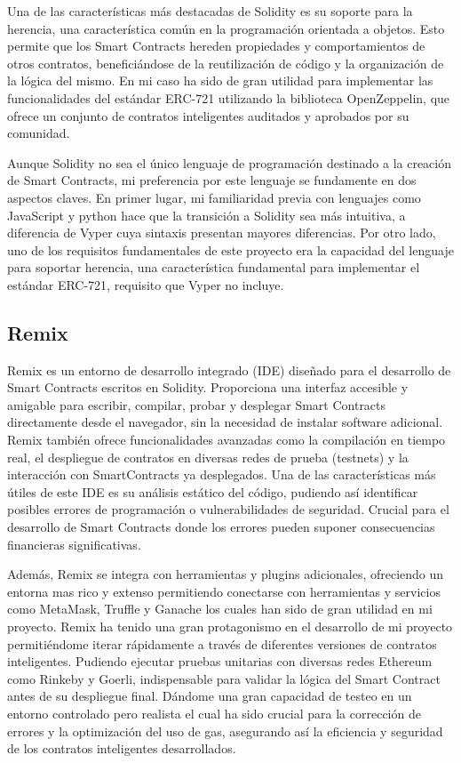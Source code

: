 Una de las características más destacadas de Solidity es su soporte para la herencia, una característica común en la programación orientada a objetos. Esto permite que los Smart Contracts hereden propiedades y comportamientos de otros contratos, beneficiándose de la reutilización de código y la organización de la lógica del mismo. En mi caso ha sido de gran utilidad para implementar las funcionalidades del estándar ERC-721 utilizando la biblioteca OpenZeppelin, que ofrece un conjunto de contratos inteligentes auditados y aprobados por su comunidad.

Aunque Solidity no sea el único lenguaje de programación destinado a la creación de Smart Contracts, mi preferencia por este lenguaje se fundamente en dos aspectos claves.
En primer lugar, mi familiaridad previa con lenguajes como JavaScript y python hace que la transición a Solidity sea más intuitiva, a diferencia de Vyper cuya sintaxis presentan mayores diferencias.
Por otro lado, uno de los requisitos fundamentales de este proyecto era la capacidad del lenguaje para soportar herencia, una característica fundamental para implementar el estándar ERC-721, requisito que Vyper no incluye.


\subsection{Remix}

Remix es un entorno de desarrollo integrado (IDE) diseñado para el desarrollo de Smart Contracts escritos en Solidity. Proporciona una interfaz accesible y amigable para escribir, compilar, probar y desplegar Smart Contracts directamente desde el navegador, sin la necesidad de instalar software adicional.
Remix también ofrece funcionalidades avanzadas como la compilación en tiempo real, el despliegue de contratos en diversas redes de prueba (testnets) y la interacción con SmartContracts ya desplegados.
Una de las características más útiles de este IDE es su análisis estático del código, pudiendo así identificar posibles errores de programación o vulnerabilidades de seguridad. Crucial para el desarrollo de Smart Contracts donde los errores pueden suponer consecuencias financieras significativas.

Además, Remix se integra con herramientas y plugins adicionales, ofreciendo un entorna mas rico y extenso permitiendo conectarse con herramientas y servicios como MetaMask, Truffle y Ganache los cuales han sido de gran utilidad en mi proyecto.
Remix ha tenido una gran protagonismo en el desarrollo de mi proyecto permitiéndome iterar rápidamente a través de diferentes versiones de contratos inteligentes. Pudiendo ejecutar pruebas unitarias con diversas redes Ethereum como Rinkeby y Goerli, indispensable para validar la lógica del Smart Contract antes de su despliegue final. Dándome una gran capacidad de testeo en un entorno controlado pero realista el cual ha sido crucial para la corrección de errores y la optimización del uso de gas, asegurando así la eficiencia y seguridad de los contratos inteligentes desarrollados.


